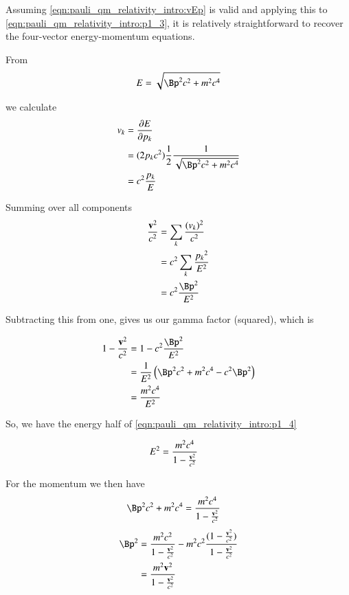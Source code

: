 Assuming \ref{eqn:pauli_qm_relativity_intro:vEp} is valid and applying this to \ref{eqn:pauli_qm_relativity_intro:p1_3}, it is relatively straightforward to
recover the four-vector energy-momentum equations.  

From
\begin{align*}
E &= \sqrt{\Bp^2 c^2 + m^2 c^4 } \\
\end{align*}

we calculate
\begin{align*}
v_k 
&= \PD{p_k}{E} \\
&= (2 p_k c^2) \inv{2} \frac{1}{\sqrt{\Bp^2 c^2 + m^2 c^4 }} \\
&= c^2 \frac{p_k}{E}
\end{align*}

Summing over all components
\begin{align*}
\frac{\Bv^2}{c^2} 
&= \sum_k \frac{(v_k)^2}{c^2} \\
&= c^2 \sum_k \frac{{p_k}^2}{E^2} \\
&= c^2 \frac{\Bp^2}{E^2} \\
\end{align*}

Subtracting this from one, gives us our gamma factor (squared), which is

\begin{align*}
1 - \frac{\Bv^2}{c^2} 
&= 1 - c^2 \frac{\Bp^2}{E^2} \\
&= \inv{E^2} \left( \Bp^2 c^2 + m^2 c^4  - c^2 {\Bp^2} \right) \\
&= \frac{m^2 c^4}{E^2} \\
\end{align*}

So, we have the energy half of \ref{eqn:pauli_qm_relativity_intro:p1_4}

\begin{align*}
E^2 &= \frac{m^2 c^4}{1 - \frac{\mathbf{v}^2}{c^2} }
\end{align*}

For the momentum we then have
\begin{align*}
\Bp^2 c^2 + m^2 c^4 &= \frac{m^2 c^4}{1 - \frac{\Bv^2}{c^2} }
\end{align*}
\begin{align*}
\Bp^2 
&= \frac{m^2 c^2}{1 - \frac{\Bv^2}{c^2} } - m^2 c^2 \frac{(1 - \frac{\Bv^2}{c^2} )}{1 - \frac{\Bv^2}{c^2} } \\
&= \frac{m^2 \Bv^2}{1 - \frac{\Bv^2}{c^2} } 
\end{align*}

